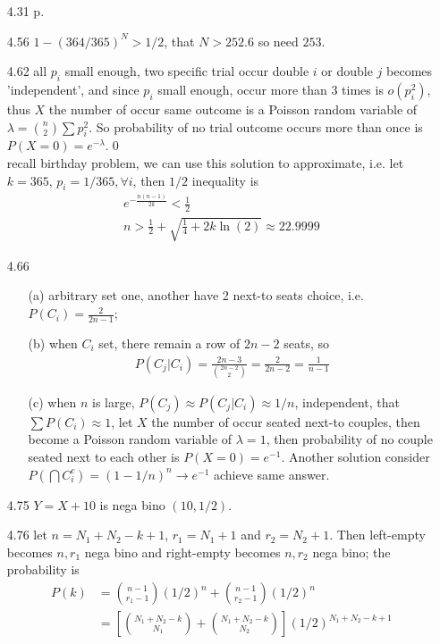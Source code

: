 \documentclass[paper=a4, fontsize=11pt]{scrartcl} %
\numberwithin{equation}{section} %
\numberwithin{figure}{section} %
\numberwithin{table}{section} %
\begin{document}
\begin{itemize}
	\item[4.31] p.
	\item[4.56] $1 - (364/365)^N > 1/2$, that $N>252.6$ so need $253$.
	\item[4.62] all $p_i$ small enough, two specific trial occur double $i$ or double $j$ becomes 'independent', and since $p_i$ small enough, occur more than 3 times is $o(p_i^2)$, thus $X$ the number of occur same outcome is a Poisson random variable of $\lambda = {n\choose 2} \sum p_i^2$. So probability of no trial outcome occurs more than once is $P(X=0) = e^{-\lambda}$.\qed\\
	recall birthday problem, we can use this solution to approximate, i.e. let $k=365$, $p_i=1/365, \forall i$, then $1/2$ inequality is
	\begin{align}
		e^{-\frac{n(n-1)}{2k}} < \frac{1}{2} \\
		n > \frac{1}{2} + \sqrt{\frac{1}{4} + 2k\ln(2)}\approx 22.9999
	\end{align}
	\item[4.66]
	\begin{itemize}
		\item[(a)] arbitrary set one, another have 2 next-to seats choice, i.e. $P(C_i) = \frac{2}{2n-1}$;
		\item[(b)] when $C_i$ set, there remain a row of $2n-2$ seats, so 
		\begin{align}
			P(C_j|C_i)  = \frac{2n-3}{{2n-2\choose 2}} = \frac{2}{2n-2} =\frac{1}{n-1}
		\end{align}
		\item[(c)] when $n$ is large, $P(C_j)\approx P(C_j|C_i)\approx 1/n$, independent, that $\sum P(C_i)\approx 1$, let $X$ the number of occur seated next-to couples, then become a Poisson random variable of $\lambda=1$, then probability of no couple seated next to each other is $P(X=0)=e^{-1}$. Another solution consider $P(\bigcap C_i^c) = (1-1/n)^n\rightarrow e^{-1}$ achieve same answer.
	\end{itemize}
	\item[4.75] $Y=X+10$ is nega bino $(10,1/2)$.
	\item[4.76] let $n=N_1+N_2-k+1$, $r_1 = N_1+1$ and $r_2=N_2+1$. Then left-empty becomes $n,r_1$ nega bino and right-empty becomes $n,r_2$ nega bino; the probability is
	\begin{align}
		P(k) &= {n-1\choose r_1-1}(1/2)^n + {n-1\choose r_2-1}(1/2)^n \\
			&= \left[{N_1+N_2-k \choose N_1}+{N_1+N_2-k \choose N_2}\right] (1/2)^{N_1+N_2-k+1}
	\end{align}

\end{itemize}
\end{document}
